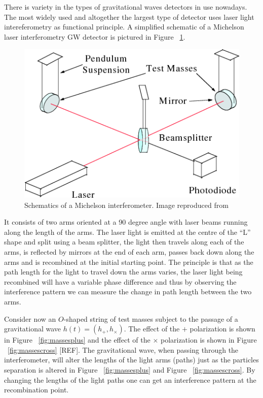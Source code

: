 \documentclass[epsf]{article}
\begin{document}
There is variety in the types of gravitational waves detectors in use nowadays. The most widely used and altogether the largest type of detector uses laser light intereferometry as functional principle. A simplified schematic of a Michelson laser interferometry GW detector is pictured in Figure ~\ref{fig:detector}.

\begin{figure}[ht]
\centering
\includegraphics[scale=0.30]{detector.png}
\caption{Schematics of a Michelson interferometer. Image reproduced from \cite{ligoweb,ian}}
\label{fig:detector}
\end{figure}

It consists of two arms oriented at a 90 degree angle with laser beams running along the length of the arms. The laser light is emitted at the centre of the “L” shape and split using a beam splitter, the light then travels along each of the arms, is reflected by mirrors at the end of each arm, passes back down along the arms and is recombined
at the initial starting point. The principle is that as the path length for the light to travel down the arms
varies, the laser light being recombined will have a variable phase difference and thus by
observing the interference pattern we can measure the change in path length between
the two arms. 

Consider now an $O$-shaped string of test masses subject to the passage of a gravitational wave $h(t)=(h_+, h_{\times})$. The effect of the $+$ polarization is shown in Figure ~\ref{fig:massesplus} and the effect of the $\times$ polarization is shown in Figure ~\ref{fig:massescross} [REF].
The gravitational wave, when passing through the interferometer, will alter the lengths of the light arms (paths) just as the particles separation is altered in Figure ~\ref{fig:massesplus} and Figure ~\ref{fig:massescross}. By changing the lengths of the light paths one can get an interference pattern at the recombination point. 
\end{document}

